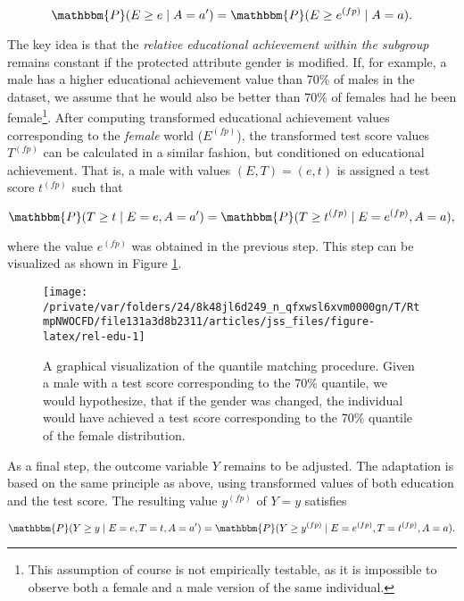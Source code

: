 \documentclass[
  nojss]{jss}
\begin{document}
\[\mathbbm{P}(E \geq e \mid A = a') = \mathbbm{P}(E \geq  {e}^{(fp)} \mid A = a).\]

The key idea is that the \emph{relative educational achievement within
the subgroup} remains constant if the protected attribute gender is
modified. If, for example, a male has a higher educational achievement
value than 70\% of males in the dataset, we assume that he would also be
better than 70\% of females had he been female\footnote{This assumption
  of course is not empirically testable, as it is impossible to observe
  both a female and a male version of the same individual.}. After
computing transformed educational achievement values corresponding to
the \emph{female} world (\( {E}^{(fp)}\)), the transformed test score
values \( {T}^{(fp)}\) can be calculated in a similar fashion, but
conditioned on educational achievement. That is, a male with values
\((E, T) = (e, t)\) is assigned a test score \( {t}^{(fp)}\) such that

\[\mathbbm{P}(T \geq t \mid E = e, A = a') = \mathbbm{P}(T \geq  {t}^{(fp)} \mid E =  {e}^{(fp)}, A = a),\]

where the value \( {e}^{(fp)}\) was obtained in the previous step. This
step can be visualized as shown in Figure \ref{fig:rel-edu}.

\begin{CodeChunk}
\begin{figure}

{\centering \texttt{[image: /private/var/folders/24/8k48jl6d249\_n\_qfxwsl6xvm0000gn/T/RtmpNWOCFD/file131a3d8b2311/articles/jss\_files/figure-latex/rel-edu-1]} 

}

\caption[A graphical visualization of the quantile matching procedure]{A graphical visualization of the quantile matching procedure. Given a male with a test score corresponding to the 70\% quantile, we would hypothesize, that if the gender was changed, the individual would have achieved a test score corresponding to the 70\% quantile of the female distribution.}\label{fig:rel-edu}
\end{figure}
\end{CodeChunk}

As a final step, the outcome variable \(Y\) remains to be adjusted. The
adaptation is based on the same principle as above, using transformed
values of both education and the test score. The resulting value
\( {y}^{(fp)}\) of \(Y = y\) satisfies

\[\mathbbm{P}(Y \geq y \mid E = e, T = t, A = a') = \mathbbm{P}(Y \geq  {y}^{(fp)} \mid E =  {e}^{(fp)}, T =  {t}^{(fp)}, A = a).\]
\end{document}
